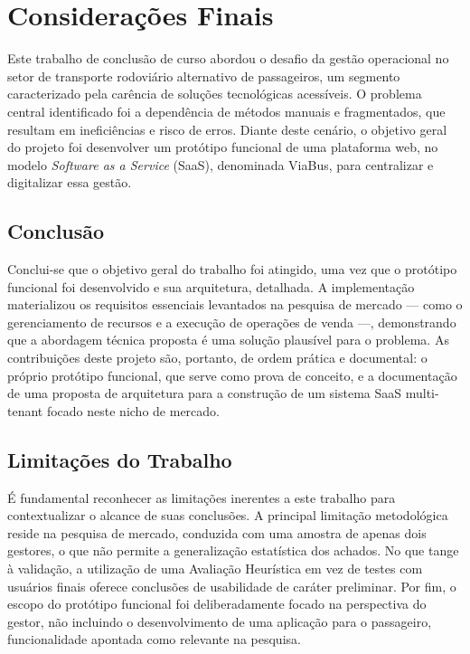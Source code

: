 \chapter{Considerações Finais}
\label{cha:consideracoes_finais}

Este trabalho de conclusão de curso abordou o desafio da gestão operacional no setor de transporte rodoviário alternativo de passageiros, um segmento caracterizado pela carência de soluções tecnológicas acessíveis. O problema central identificado foi a dependência de métodos manuais e fragmentados, que resultam em ineficiências e risco de erros. Diante deste cenário, o objetivo geral do projeto foi desenvolver um protótipo funcional de uma plataforma web, no modelo \textit{Software as a Service} (SaaS), denominada ViaBus, para centralizar e digitalizar essa gestão.

\section{Conclusão}

Conclui-se que o objetivo geral do trabalho foi atingido, uma vez que o protótipo funcional foi desenvolvido e sua arquitetura, detalhada. A implementação materializou os requisitos essenciais levantados na pesquisa de mercado — como o gerenciamento de recursos e a execução de operações de venda —, demonstrando que a abordagem técnica proposta é uma solução plausível para o problema. As contribuições deste projeto são, portanto, de ordem prática e documental: o próprio protótipo funcional, que serve como prova de conceito, e a documentação de uma proposta de arquitetura para a construção de um sistema SaaS multi-tenant focado neste nicho de mercado.

\section{Limitações do Trabalho}

É fundamental reconhecer as limitações inerentes a este trabalho para contextualizar o alcance de suas conclusões. A principal limitação metodológica reside na pesquisa de mercado, conduzida com uma amostra de apenas dois gestores, o que não permite a generalização estatística dos achados. No que tange à validação, a utilização de uma Avaliação Heurística em vez de testes com usuários finais oferece conclusões de usabilidade de caráter preliminar. Por fim, o escopo do protótipo funcional foi deliberadamente focado na perspectiva do gestor, não incluindo o desenvolvimento de uma aplicação para o passageiro, funcionalidade apontada como relevante na pesquisa.

